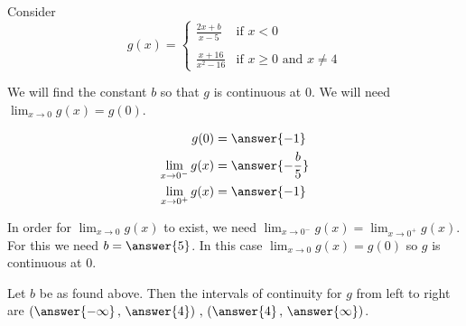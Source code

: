 \documentclass{ximera}
\author{Nela Lakos \and Kyle Parsons}
\begin{document}
\begin{exercise}
	Consider
	\[
		g(x) = 
			\begin{cases}
				\frac{2x+b}{x-5} & \text{if }x<0\\ \\
				\frac{x+16}{x^2-16} & \text{if }x\geq0\text{ and }x\neq4
			\end{cases}
	\]

	We will find the constant $b$ so that $g$ is continuous at 0.  We will need $\lim_{x\to0}g(x) = g(0)$.  

	\begin{align*}
		g(0) &= \answer{-1}\\
		\lim_{x\to0^-} g(x) &= \answer{-\frac{b}{5}}\\
		\lim_{x\to0^+} g(x) &= \answer{-1}
	\end{align*}

	\begin{exercise}
		In order for $\lim_{x\to0}g(x)$ to exist, we need $\lim_{x\to0^-}g(x) = \lim_{x\to0^+}g(x)$. For this we need $b = \answer{5}$.  In this case $\lim_{x\to0}g(x) = g(0)$ so $g$ is continuous at 0.

		\begin{exercise}
			Let $b$ be as found above.  Then the intervals of continuity for $g$ from left to right are $\left(\answer{-\infty}\, , \,\answer{4}\right)\, , \, \left(\answer{4}\, , \,\answer{\infty}\right)$.
		\end{exercise}
	\end{exercise}
\end{exercise}
\end{document}
